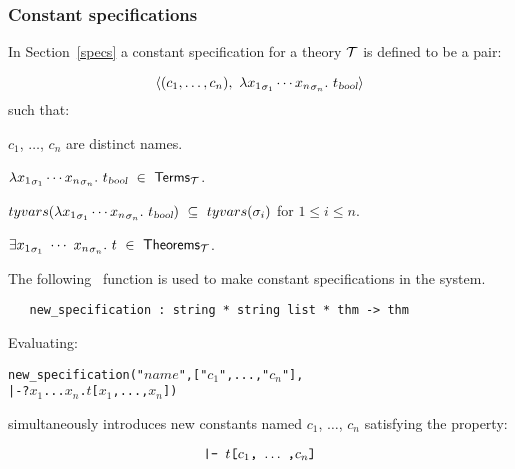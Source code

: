 \subsubsection{Constant specifications}
\label{conspec}

In Section~\ref{specs} a constant specification for a theory ${\cal T}$
is defined to be a pair:

\[
\langle(c_1,\ldots,c_n),\ \lquant{{x_1}_{\sigma_1}
\cdots {x_n}_{\sigma_n}}t_{\small\ty{bool}}\rangle
\]
such that:

\begin{myenumerate}
\item $c_1$, $\dots$, $c_n$ are distinct names.
\item $\lambda {x_1}_{\sigma_1}
\cdots {x_n}_{\sigma_n}.\ t_{\small\textsl{bool}}\ \in\ {\sf Terms}_{\cal T}$.
\item $tyvars(\lquant{{x_1}_{\sigma_1}
\cdots {x_n}_{\sigma_n}}t_{\small\ty{bool}})\ \subseteq\ tyvars(\sigma_i)$ for
$1\leq i\leq n$.
\item $\equant{{x_1}_{\sigma_1}\ \cdots\ {x_n}_{\sigma_n}}t
\ \in\ {\sf Theorems}_{\cal T}$.
\end{myenumerate}
The following \ML\ function is used to make constant specifications in
the \HOL{} system.

\begin{boxed}
\begin{verbatim}
   new_specification : string * string list * thm -> thm
\end{verbatim}
\end{boxed}
%
Evaluating:
{
\newcommand{\cone}{\ensuremath{c_1}}
\newcommand{\cn}{\ensuremath{c_n}}
\newcommand{\xone}{\ensuremath{x_1}}
\newcommand{\xn}{\ensuremath{x_n}}
\begin{alltt}
   new_specification("\(\mathit{name}\)", ["\cone", ..., "\cn"],
                     |- ?\xone ... \xn. \(t\)[\xone, ..., \xn])
\end{alltt}
}
simultaneously  introduces  new constants  named $c_1$, $\dots$,
$c_n$ satisfying the property:

\[ \ml{|- }t\ml{[}c_1\ml{,}\ \ldots\ \ml{,}c_n\ml{]} \]

